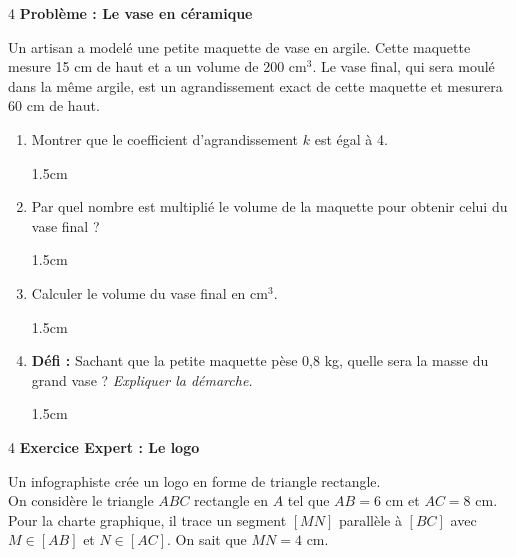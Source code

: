 \documentclass[a4paper]{book}
\begin{document}
{     
    \begin{exerciceNote}{4}
        \textbf{Problème : Le vase en céramique}
        
        Un artisan a modelé une petite maquette de vase en argile. Cette maquette mesure 15 cm de haut et a un volume de 200 cm$^3$. 
        Le vase final, qui sera moulé dans la même argile, est un agrandissement exact de cette maquette et mesurera 60 cm de haut.
        
        \begin{enumerate}
            \item Montrer que le coefficient d'agrandissement $k$ est égal à 4.
            \begin{ZoneReponse}{1.5cm}
            \end{ZoneReponse}
            
            \item Par quel nombre est multiplié le volume de la maquette pour obtenir celui du vase final ?
            \begin{ZoneReponse}{1.5cm}
            \end{ZoneReponse}
            
            \item Calculer le volume du vase final en cm$^3$.
            \begin{ZoneReponse}{1.5cm}
            \end{ZoneReponse}

\newpage
            
            \item \textbf{Défi :} Sachant que la petite maquette pèse 0,8 kg, quelle sera la masse du grand vase ? \textit{Expliquer la démarche.}
            \begin{ZoneReponse}{1.5cm}
            \end{ZoneReponse}
        \end{enumerate}
    \end{exerciceNote}


    \begin{exerciceNote}{4}
        \textbf{Exercice Expert : Le logo}
        
        Un infographiste crée un logo en forme de triangle rectangle. \\
        On considère le triangle $ABC$ rectangle en $A$ tel que $AB = 6$ cm et $AC = 8$ cm.
        Pour la charte graphique, il trace un segment $[MN]$ parallèle à $[BC]$ avec $M \in [AB]$ et $N \in [AC]$. 
        On sait que $MN = 4$ cm.
        

\end{exerciceNote}}
\end{document}
